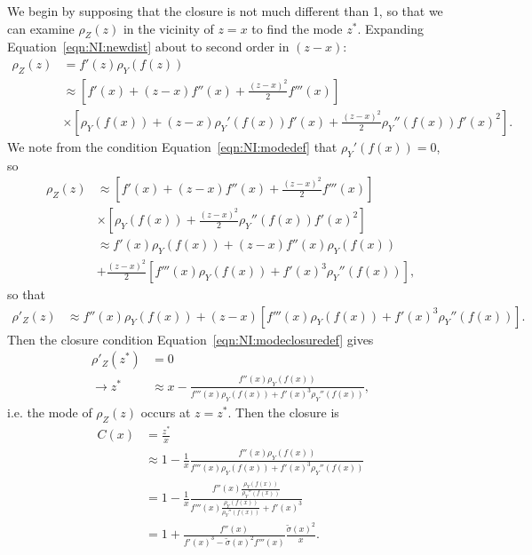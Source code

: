 We begin by supposing that the closure is not much different than 1, so that we can examine $\rho_Z(z)$ in the vicinity of $z=x$ to find the mode $z^*$. Expanding Equation~\ref{eqn:NI:newdist} about to second order in $(z-x)$:
\begin{align}
\rho_Z(z) &= f'(z)\rho_Y(f(z))\nonumber\\
&\approx \left[f'(x)+(z-x)f''(x)+\frac{(z-x)^2}{2}f'''(x)\right]\nonumber\\
&\times\left[\rho_Y(f(x))+(z-x)\rho_Y'(f(x))f'(x)+\frac{(z-x)^2}{2}\rho_Y''(f(x))f'(x)^2\right].
\end{align}
We note from the condition Equation~\ref{eqn:NI:modedef} that $\rho_Y'(f(x))=0$, so
\begin{align}
\rho_Z(z)&\approx \left[f'(x)+(z-x)f''(x)+\frac{(z-x)^2}{2}f'''(x)\right]\nonumber\\
&\times\left[\rho_Y(f(x))+\frac{(z-x)^2}{2}\rho_Y''(f(x))f'(x)^2\right]\nonumber\\
&\approx f'(x)\rho_Y(f(x))+(z-x)f''(x)\rho_Y(f(x))\nonumber\\
&+\frac{(z-x)^2}{2}\left[f'''(x)\rho_Y(f(x))+f'(x)^3\rho_Y''(f(x))\right],
\end{align}
so that
\begin{align}
\rho'_Z(z)&\approx f''(x)\rho_Y(f(x))+(z-x)\left[f'''(x)\rho_Y(f(x))+f'(x)^3\rho_Y''(f(x))\right].
\label{eqn:NI:drhoz}
\end{align}
Then the closure condition Equation~\ref{eqn:NI:modeclosuredef} gives
\begin{align}
\rho'_Z(z^*)&=0\nonumber\\
\rightarrow z^* &\approx x-\frac{f''(x)\rho_Y(f(x))}{f'''(x)\rho_Y(f(x))+f'(x)^3\rho_Y''(f(x))},
\end{align}
i.e. the mode of $\rho_Z(z)$ occurs at $z=z^*$.  Then the closure is
\begin{align}
  C(x) &= \frac{z^*}{x}\nonumber\\
&\approx 1-\frac{1}{x}\frac{f''(x)\rho_Y(f(x))}{f'''(x)\rho_Y(f(x))+f'(x)^3\rho_Y''(f(x))}\nonumber\\
&=1-\frac{1}{x}\frac{f''(x)\frac{\rho_Y(f(x))}{\rho_Y''(f(x))}}{f'''(x)\frac{\rho_Y(f(x))}{\rho_Y''(f(x))}+f'(x)^3}\nonumber\\
&=1+\frac{f''(x)}{f'(x)^3-\tilde{\sigma}(x)^2f'''(x)}\frac{\tilde{\sigma}(x)^2}{x}.
\label{eqn:NI:mode_closure_df3}
\end{align}

